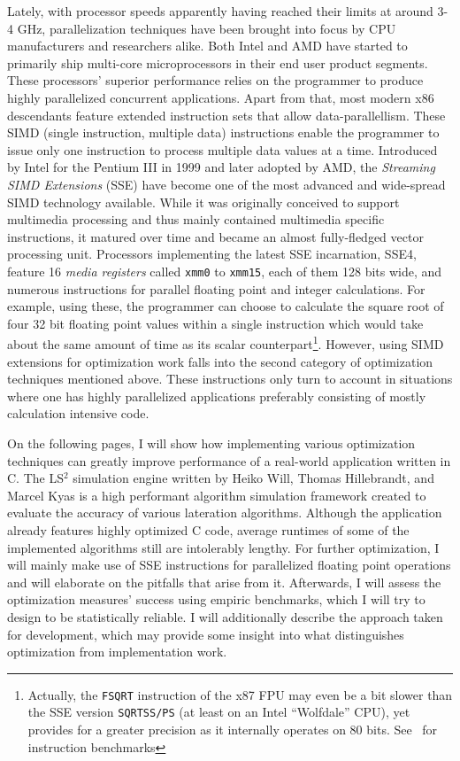 Lately, with processor speeds apparently having reached their limits at around 3-4 GHz, parallelization techniques have been brought into focus by CPU manufacturers and researchers alike. Both Intel and AMD have started to primarily ship multi-core microprocessors in their end user product segments. These processors' superior performance relies on the programmer to produce highly parallelized concurrent applications. Apart from that, most modern x86 descendants feature extended instruction sets that allow data-parallellism. These SIMD (single instruction, multiple data) instructions enable the programmer to issue only one instruction to process multiple data values at a time. Introduced by Intel for the Pentium III in 1999 and later adopted by AMD, the \emph{Streaming SIMD Extensions} (SSE) have become one of the most advanced and wide-spread SIMD technology available. While it was originally conceived to support multimedia processing and thus mainly contained multimedia specific instructions, it matured over time and became an almost fully-fledged vector processing unit. Processors implementing the latest SSE incarnation, SSE4, feature 16 \emph{media registers} called \texttt{xmm0} to \texttt{xmm15}, each of them 128 bits wide, and numerous instructions for parallel floating point and integer calculations. For example, using these, the programmer can choose to calculate the square root of four 32 bit floating point values within a single instruction which would take about the same amount of time as its scalar counterpart\footnote{Actually, the \texttt{FSQRT} instruction of the x87 FPU may even be a bit slower than the SSE version \texttt{SQRTSS/PS} (at least on an Intel ``Wolfdale'' CPU), yet provides for a greater precision as it internally operates on 80 bits. See~\cite{fog2011instructiontables} for instruction benchmarks}. However, using SIMD extensions for optimization work falls into the second category of optimization techniques mentioned above. These instructions only turn to account in situations where one has highly parallelized applications preferably consisting of mostly calculation intensive code.

On the following pages, I will show how implementing various optimization techniques can greatly improve performance of a real-world application written in C. The LS$^{2}$ simulation engine written by Heiko Will, Thomas Hillebrandt, and Marcel Kyas is a high performant algorithm simulation framework created to evaluate the accuracy of various lateration algorithms. Although the application already features highly optimized C code, average runtimes of some of the implemented algorithms still are intolerably lengthy. For further optimization, I will mainly make use of SSE instructions for parallelized floating point operations and will elaborate on the pitfalls that arise from it. Afterwards, I will assess the optimization measures' success using empiric benchmarks, which I will try to design to be statistically reliable. I will additionally describe the approach taken for development, which may provide some insight into what distinguishes optimization from implementation work.

